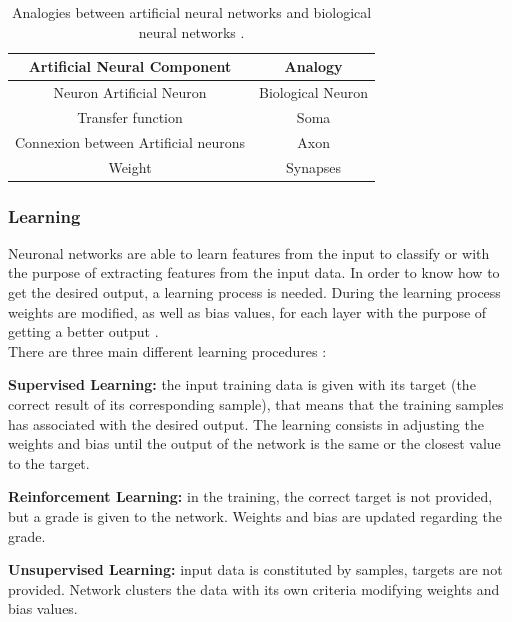 \begin{table}[htb]
\centering
\begin{tabular}{|c|c|}
\hline
\rowcolor[HTML]{ECF4FF} \textbf{Artificial Neural Component} & \textbf{Analogy}        \\ \hline
Neuron Artificial Neuron                        & Biological Neuron       \\
Transfer function                & Soma \\
Connexion between Artificial neurons               & Axon                     \\
Weight                                     & Synapses                 \\ \hline
\end{tabular}  \caption{Analogies between artificial neural networks and biological neural networks \cite{Analogies}.} \label{table:Analogias}
\end{table}

\subsubsection{Learning}
Neuronal networks are able to learn features from the input to classify or with the purpose of extracting features from the input data. In order to know how to get the desired output, a learning process is needed. During the learning process weights are modified, as well as bias values, for each layer with the purpose of getting a better output \cite{NNDesign}.\\

There are three main different learning procedures \cite{NNDesign,Duda}:
\begin{description}[itemsep=2pt,topsep=8pt,parsep=0pt,partopsep=20pt]
	\item \textbf{Supervised Learning:} the input training data is given with its target (the correct result of its corresponding sample), that means that the training samples has associated with the desired output. The learning consists in adjusting the weights and bias until the output of the network is the same or the closest value to the target.
	\item \textbf{Reinforcement Learning:} in the training, the correct target is not provided, but a grade is given to the network. Weights and bias are updated regarding the grade.
	\item \textbf{Unsupervised Learning:} input data is constituted by samples, targets are not provided. Network clusters the data with its own criteria modifying weights and bias values.
\end{description}

